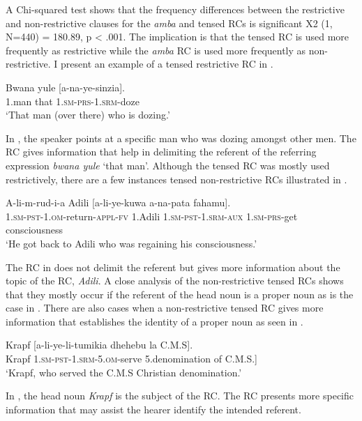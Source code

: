\documentclass[output=paper,colorlinks,citecolor=brown]{langscibook}
\begin{document}
A Chi-squared test shows that the frequency differences between the restrictive and non-restrictive clauses for the \textit{amba} and tensed RCs is significant X2 (1, N=440) = 180.89, p < .001. The implication is that the tensed RC is used more frequently as restrictive while the \textit{amba} RC is used more frequently as non-restrictive. I present an example of a tensed restrictive RC in .

\ea%
    \label{ex:mwamzandi:14}
    \gll    Bwana yule [a-na-ye-sinzia].\\
            1.man  that  \textsc{1.sm-prs-1.srm-}doze\\
    \glt    ‘That man (over there) who is dozing.’
\z

In , the speaker points at a specific man who was dozing amongst other men. The RC gives information that help in delimiting the referent of the referring expression \textit{bwana yule} ‘that man’. Although the tensed RC was mostly used restrictively, there are a few instances tensed non-restrictive RCs illustrated in .

\ea%
    \label{ex:mwamzandi:15}
    \gll    A-li-m-rud-i-a Adili [a-li-ye-kuwa a-na-pata fahamu].\\
            \textsc{1.sm-pst-1.om-}return\textsc{-appl-fv} 1.Adili \textsc{1.sm-pst-1.srm-aux} \textsc{1.sm-prs-}get consciousness\\
    \glt    ‘He got back to Adili who was regaining his consciousness.’
\z

The RC in  does not delimit the referent but gives more information about the topic of the RC, \textit{Adili}. A close analysis of the non-restrictive tensed RCs shows that they mostly occur if the referent of the head noun is a proper noun as is the case in . There are also cases when a non-restrictive tensed RC gives more information that establishes the identity of a proper noun as seen in .

\ea%
    \label{ex:mwamzandi:16}
    \gll    Krapf [a-li-ye-li-tumikia dhehebu la C.M.S].\\
            Krapf  \textsc{1.sm-pst-1.srm-5.om-}serve 5.denomination of C.M.S.]\\
    \glt    ‘Krapf, who served the C.M.S Christian denomination.’
\z

In , the head noun \textit{Krapf} is the subject of the RC. The RC presents more specific information that may assist the hearer identify the intended referent.
\end{document}
